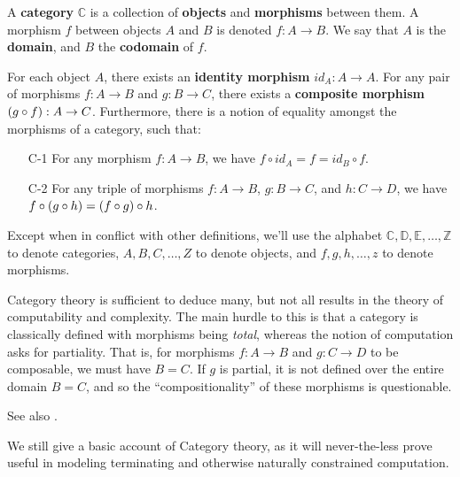 \begin{specification} A \textbf{category} $\mathbb{C}$ is a collection of
\textbf{objects} and \textbf{morphisms} between them. A morphism $f$ between
objects $A$ and $B$ is denoted $f:A\rightarrow B$. We say that $A$ is the
\textbf{domain}, and $B$ the \textbf{codomain} of $f$.

For each object $A$, there exists an \textbf{identity morphism}
$id_A:A\rightarrow A$. For any pair of morphisms $f : A\rightarrow B$ and $g :
B \rightarrow C$, there exists a \textbf{composite morphism} ${\mathopen{}\left({g\circ f}\right)\mathclose{}} : A
\rightarrow C$.  Furthermore, there is a notion of equality amongst the
morphisms of a category, such that:

\begin{enumerate}

\item [C-1] For any morphism $f:A\rightarrow B$, we have $f\circ id_A = f =
id_B \circ f$.

\item [C-2] For any triple of morphisms $f : A \rightarrow B$, $g : B
\rightarrow C$, and $h : C \rightarrow D$, we have $f\circ {\ensuremath{\mathopen{}\left({g \circ h}\right)\mathclose{}}} =
{\mathopen{}\left({f\circ g}\right)\mathclose{}} \circ h$.

\end{enumerate}

\end{specification}

\begin{notation} Except when in conflict with other definitions, we'll use the
alphabet $\mathbb{C},\mathbb{D},\mathbb{E},\ldots,\mathbb{Z}$ to denote
categories, $A,B,C,\ldots,Z$ to denote objects, and $f,g,h,\ldots,z$ to denote
morphisms.  \end{notation}


Category theory is sufficient to deduce many, but not all results in the theory
of computability and complexity\cite{di-paola-heller-1987}. The main hurdle to
this is that a category is classically defined with morphisms being
\emph{total}, whereas the notion of computation asks for partiality. That is,
for morphisms $f : A \rightarrow B$ and $g : C \rightarrow D$ to be composable,
we must have $B=C$. If $g$ is partial, it is not defined over the entire domain
$B=C$, and so the ``compositionality'' of these morphisms is questionable.

See also \cite{moggi-1991}.

We still give a basic account of Category theory, as it will never-the-less
prove useful in modeling terminating and otherwise naturally constrained
computation.

